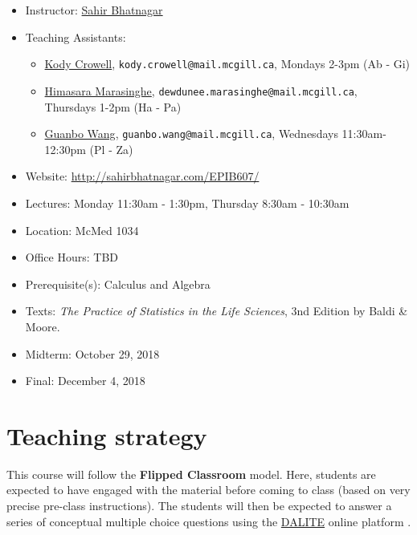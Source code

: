 \documentclass[]{book}
\providecommand{\tightlist}{%
  \setlength{\itemsep}{0pt}\setlength{\parskip}{0pt}}
\providecommand{\tightlist}{%
  \setlength{\itemsep}{0pt}\setlength{\parskip}{0pt}}
\theoremstyle{definition}
\theoremstyle{definition}
\theoremstyle{definition}
\theoremstyle{remark}
\begin{document}
\begin{itemize}
\tightlist
\item
  Instructor: \href{mailto:sahir.bhatnagar@mcgill.ca}{Sahir Bhatnagar}\\
\item
  Teaching Assistants:

  \begin{itemize}
  \tightlist
  \item
    \href{mailto:kody.crowell@mail.mcgill.ca}{Kody Crowell},
    \texttt{kody.crowell@mail.mcgill.ca}, Mondays 2-3pm (Ab - Gi)
  \item
    \href{mailto:dewdunee.marasinghe@mail.mcgill.ca}{Himasara
    Marasinghe}, \texttt{dewdunee.marasinghe@mail.mcgill.ca}, Thursdays
    1-2pm (Ha - Pa)
  \item
    \href{mailto:guanbo.wang@mail.mcgill.ca}{Guanbo Wang},
    \texttt{guanbo.wang@mail.mcgill.ca}, Wednesdays 11:30am-12:30pm (Pl
    - Za)
  \end{itemize}
\item
  Website: \url{http://sahirbhatnagar.com/EPIB607/}\\
\item
  Lectures: Monday 11:30am - 1:30pm, Thursday 8:30am - 10:30am\\
\item
  Location: McMed 1034\\
\item
  Office Hours: TBD\\
\item
  Prerequisite(s): Calculus and Algebra\\
\item
  Texts: \emph{The Practice of Statistics in the Life Sciences}, 3nd
  Edition by Baldi \& Moore.\\
\item
  Midterm: October 29, 2018
\item
  Final: December 4, 2018
\end{itemize}

\section{Teaching strategy}\label{teaching-strategy}

This course will follow the \textbf{Flipped Classroom} model. Here,
students are expected to have engaged with the material before coming to
class (based on very precise pre-class instructions). The students will
then be expected to answer a series of conceptual multiple choice
questions using the
\href{https://mydalite.org/en/live/signup/form/NTc4}{DALITE} online
platform \citep{bhatnagar2016dalite}.
\end{document}
